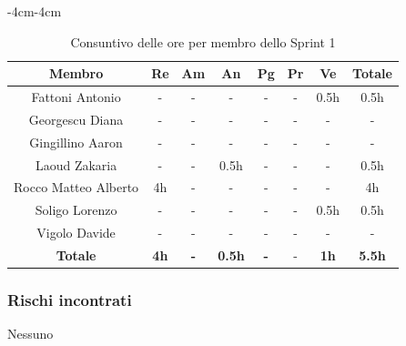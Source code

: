 \documentclass[a4paper,12pt]{article}
\begin{document}
\begin{table}[H]
    \begin{adjustwidth}{-4cm}{-4cm}
    \centering
    \begin{tabular}{|c|c|c|c|c|c|c|c|}
        \hline
        \textbf{Membro} & \textbf{Re} & \textbf{Am} & \textbf{An} & \textbf{Pg} & \textbf{Pr} & \textbf{Ve} & \textbf{Totale} \\
        \hline
        Fattoni Antonio & - & - & - & - & - & 0.5h & 0.5h\\
        \hline
        Georgescu Diana & - & - & - & - & - & - & - \\
        \hline
        Gingillino Aaron & - & - & - & - & - & - & - \\
        \hline
        Laoud Zakaria & - & - & 0.5h & - & - & - & 0.5h \\
        \hline
        Rocco Matteo Alberto& 4h & - & - & - & -& - & 4h \\
        \hline
        Soligo Lorenzo & - & - & - & - & - & 0.5h & 0.5h \\
        \hline
        Vigolo Davide & - & - & - & - & - & - & - \\
        \hline
        \textbf{Totale} & \textbf{4h}& \textbf{-} & \textbf{0.5h}& \textbf{-}& -& \textbf{1h}&  \textbf{5.5h}\\
        \hline
    \end{tabular}
    \caption{Consuntivo delle ore per membro dello Sprint 1}
    \end{adjustwidth}
\end{table}


\subsubsection{Rischi incontrati}
Nessuno
\end{document}
